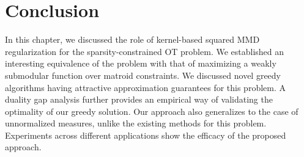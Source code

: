 \section{Conclusion}
In this chapter, we discussed the role of kernel-based squared MMD regularization for the sparsity-constrained OT problem. We established an interesting equivalence of the problem with that of maximizing a weakly submodular function over matroid constraints. We discussed novel greedy algorithms having attractive approximation guarantees for this problem. A duality gap analysis further provides an empirical way of validating the optimality of our greedy solution. Our approach also generalizes to the case of unnormalized measures, unlike the existing methods for this problem.
Experiments across different applications show the efficacy of the proposed approach.  

